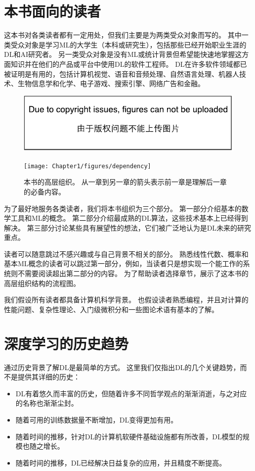 \section{本书面向的读者}
\label{sec:who_should_read_this_book}

这本书对各类读者都有一定用处，但我们主要是为两类受众对象而写的。
其中一类受众对象是学习\gls{ML}的大学生（本科或研究生），包括那些已经开始职业生涯的\gls{DL}和\gls{AI}研究者。
另一类受众对象是没有\gls{ML}或统计背景但希望能快速地掌握这方面知识并在他们的产品或平台中使用\gls{DL}的软件工程师。
\gls{DL}在许多软件领域都已被证明是有用的，包括计算机视觉、语音和音频处理、自然语言处理、机器人技术、生物信息学和化学、电子游戏、搜索引擎、网络广告和金融。

\begin{figure}[!htb]
\ifOpenSource
\centerline{\includegraphics{figure.pdf}}
\else
\centerline{\texttt{[image: Chapter1/figures/dependency]}}
\fi
\caption{本书的高层组织。
从一章到另一章的箭头表示前一章是理解后一章的必备内容。}
\label{fig:chap1_dependency}
\end{figure}


为了最好地服务各类读者，我们将本书组织为三个部分。
第一部分介绍基本的数学工具和\gls{ML}的概念。
第二部分介绍最成熟的\gls{DL}算法，这些技术基本上已经得到解决。
第三部分讨论某些具有展望性的想法，它们被广泛地认为是\gls{DL}未来的研究重点。

读者可以随意跳过不感兴趣或与自己背景不相关的部分。
熟悉线性代数、概率和基本\gls{ML}概念的读者可以跳过第一部分，例如，当读者只是想实现一个能工作的系统则不需要阅读超出第二部分的内容。
为了帮助读者选择章节，展示了这本书的高层组织结构的流程图。


我们假设所有读者都具备计算机科学背景。
也假设读者熟悉编程，并且对计算的性能问题、复杂性理论、入门级微积分和一些图论术语有基本的了解。
% 
\section{深度学习的历史趋势}
\label{sec:historical_trends_in_deep_learning}
通过历史背景了解\gls{DL}是最简单的方式。
这里我们仅指出\gls{DL}的几个关键趋势，而不是提供其详细的历史：
\begin{itemize}
 \item \gls{DL}有着悠久而丰富的历史，但随着许多不同哲学观点的渐渐消逝，与之对应的名称也渐渐尘封。
 \item 随着可用的训练数据量不断增加，\gls{DL}变得更加有用。
 \item 随着时间的推移，针对\gls{DL}的计算机软硬件基础设施都有所改善，\gls{DL}模型的规模也随之增长。
 \item 随着时间的推移，\gls{DL}已经解决日益复杂的应用，并且精度不断提高。
\end{itemize}

